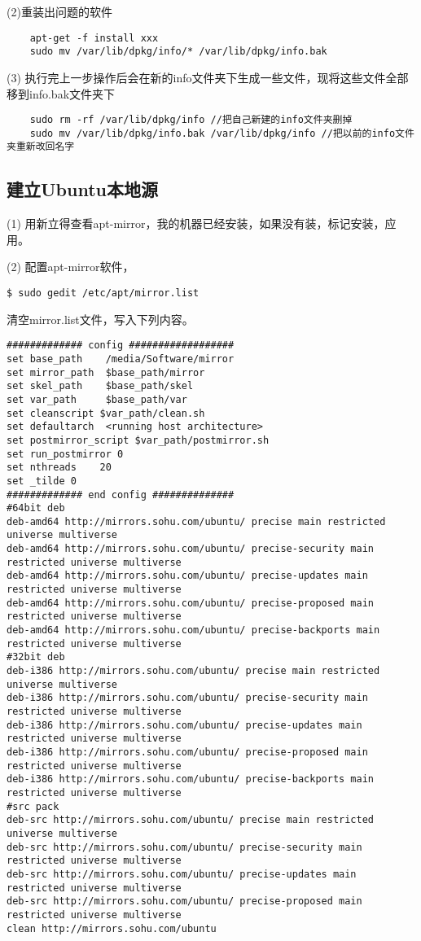 (2)重装出问题的软件
\begin{verbatim}
    apt-get -f install xxx
    sudo mv /var/lib/dpkg/info/* /var/lib/dpkg/info.bak
\end{verbatim}

(3) 执行完上一步操作后会在新的info文件夹下生成一些文件，现将这些文件全部移到info.bak文件夹下
\begin{verbatim}
    sudo rm -rf /var/lib/dpkg/info //把自己新建的info文件夹删掉
    sudo mv /var/lib/dpkg/info.bak /var/lib/dpkg/info //把以前的info文件夹重新改回名字
\end{verbatim}

\subsection{建立Ubuntu本地源}
(1) 用新立得查看apt-mirror，我的机器已经安装，如果没有装，标记安装，应用。

(2) 配置apt-mirror软件，

\verb"$ sudo gedit /etc/apt/mirror.list"

清空mirror.list文件，写入下列内容。
\begin{verbatim}
############# config ##################
set base_path    /media/Software/mirror
set mirror_path  $base_path/mirror
set skel_path    $base_path/skel
set var_path     $base_path/var
set cleanscript $var_path/clean.sh
set defaultarch  <running host architecture>
set postmirror_script $var_path/postmirror.sh
set run_postmirror 0
set nthreads    20
set _tilde 0
############# end config ##############
#64bit deb
deb-amd64 http://mirrors.sohu.com/ubuntu/ precise main restricted universe multiverse
deb-amd64 http://mirrors.sohu.com/ubuntu/ precise-security main restricted universe multiverse
deb-amd64 http://mirrors.sohu.com/ubuntu/ precise-updates main restricted universe multiverse
deb-amd64 http://mirrors.sohu.com/ubuntu/ precise-proposed main restricted universe multiverse
deb-amd64 http://mirrors.sohu.com/ubuntu/ precise-backports main restricted universe multiverse
#32bit deb
deb-i386 http://mirrors.sohu.com/ubuntu/ precise main restricted universe multiverse
deb-i386 http://mirrors.sohu.com/ubuntu/ precise-security main restricted universe multiverse
deb-i386 http://mirrors.sohu.com/ubuntu/ precise-updates main restricted universe multiverse
deb-i386 http://mirrors.sohu.com/ubuntu/ precise-proposed main restricted universe multiverse
deb-i386 http://mirrors.sohu.com/ubuntu/ precise-backports main restricted universe multiverse
#src pack
deb-src http://mirrors.sohu.com/ubuntu/ precise main restricted universe multiverse
deb-src http://mirrors.sohu.com/ubuntu/ precise-security main restricted universe multiverse
deb-src http://mirrors.sohu.com/ubuntu/ precise-updates main restricted universe multiverse
deb-src http://mirrors.sohu.com/ubuntu/ precise-proposed main restricted universe multiverse
clean http://mirrors.sohu.com/ubuntu
\end{verbatim}

